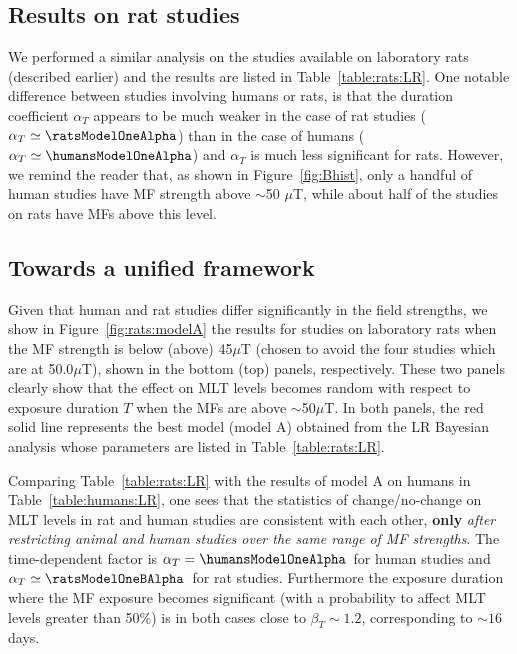 \documentclass[a4]{article}
\begin{document}
\subsection*{Results on rat studies}
\label{section:results:rats}

We performed a similar analysis on the  studies available on laboratory rats (described earlier) and the results are listed  in  Table~\ref{table:rats:LR}. One notable difference  between studies involving humans or rats, is that the duration coefficient $\alpha_T$
 appears to be much weaker in the case of rat studies ($\alpha_T\simeq \ratsModelOneAlpha$) than in the case of humans ($\alpha_T\simeq \humansModelOneAlpha$) and  $\alpha_T$ is much less significant  for rats.
However, we remind the reader that, as shown in Figure~\ref{fig:Bhist}, only a handful of human studies  have MF strength above $
\sim$50 $\mu$T, while about half of the studies on rats have MFs above this level.


\subsection*{Towards a unified framework} 
\label{section:results:bimodal}

Given that human and rat studies differ significantly in the field strengths,  we show  in Figure~\ref{fig:rats:modelA}  the results for studies on laboratory rats when the MF strength is below (above)  45$\mu$T (chosen to avoid the four studies which are at 50.0$\mu$T), shown   in the bottom (top) panels, respectively. 
These two panels clearly show that the effect on MLT levels becomes  random with respect to exposure duration $T$ when the MFs are above $\sim$50$\mu$T.
In both panels, the red solid line represents the best  model (model A) obtained from the LR Bayesian analysis whose parameters are listed in Table~\ref{table:rats:LR}.


Comparing Table~\ref{table:rats:LR} with the results of model A on humans in Table~\ref{table:humans:LR},
one sees that  the statistics of change/no-change on MLT levels in
 rat and human studies are consistent with each other,  {\bf only} {\it after restricting animal and human studies over the same range of MF strengths}.
The time-dependent factor  is $\alpha_T=\humansModelOneAlpha$\humansModelOneAlphaErr\ for human studies and $\alpha_T\simeq\ratsModelOneBAlpha$\ratsModelOneBAlphaErr\ for rat studies. 
 Furthermore the exposure duration where the MF exposure  becomes significant (with a probability to affect MLT levels greater than 50\%) is in both cases close to $\beta_T\sim1.2$, corresponding to  $\sim16$ days.
\end{document}
